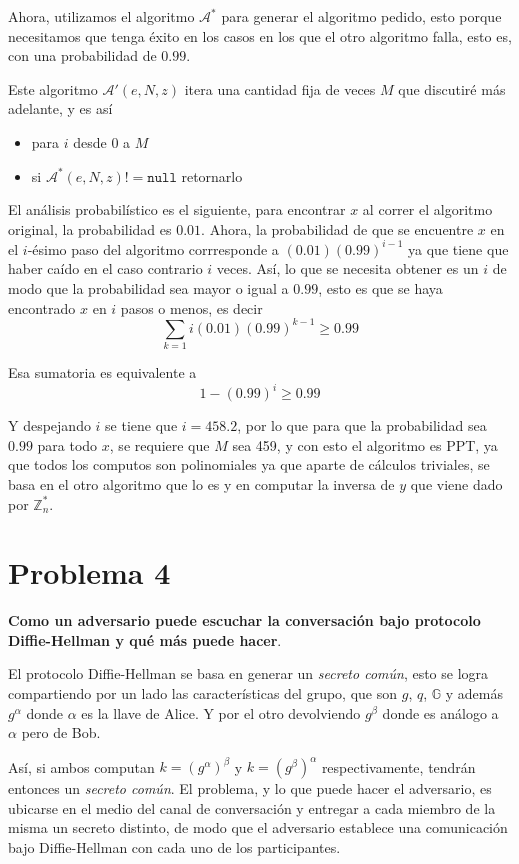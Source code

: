 \documentclass[twoside]{tareas}
\begin{document}
Ahora, utilizamos el algoritmo $\mathcal{A}^*$ para generar el algoritmo pedido, esto porque necesitamos que tenga éxito en los casos en los que el otro algoritmo falla, esto es, con una probabilidad de $0.99$.

Este algoritmo $\mathcal{A}'(e, N, z)$ itera una cantidad fija de veces $M$ que discutiré más adelante, y es así

\begin{itemize}
    \item para $i$ desde 0 a $M$
    \item si $\mathcal{A}^*(e, N, z) != \texttt{null}$ retornarlo
\end{itemize}

El análisis probabilístico es el siguiente, para encontrar $x$ al correr el algoritmo original, la probabilidad es $0.01$. Ahora, la probabilidad de que se encuentre $x$ en el $i$-ésimo paso del algoritmo corrresponde a $(0.01)(0.99)^{i-1}$ ya que tiene que haber caído en el caso contrario $i$ veces. Así, lo que se necesita obtener es un $i$ de modo que la probabilidad sea mayor o igual a $0.99$, esto es que se haya encontrado $x$ en $i$ pasos o menos, es decir
$$\sum_{k=1}{i}(0.01)(0.99)^{k-1} \geq 0.99$$

Esa sumatoria es equivalente a
$$1-(0.99)^i \geq 0.99$$

Y despejando $i$ se tiene que $i=458.2$, por lo que para que la probabilidad sea $0.99$ para todo $x$, se requiere que $M$ sea 459, y con esto el algoritmo es PPT, ya que todos los computos son polinomiales ya que aparte de cálculos triviales, se basa en el otro algoritmo que lo es y en computar la inversa de $y$ que viene dado por $\mathbb{Z}_n^*$.


\section*{Problema 4}

\textbf{Como un adversario puede escuchar la conversación bajo protocolo Diffie-Hellman y qué más puede hacer}.

El protocolo Diffie-Hellman se basa en generar un \textit{secreto común}, esto se logra compartiendo por un lado las características del grupo, que son $g$, $q$, $\mathbb{G}$ y además $g^\alpha$ donde $\alpha$ es la llave de Alice. Y por el otro devolviendo $g^\beta$ donde es análogo a $\alpha$ pero de Bob.

Así, si ambos computan $k = (g^\alpha)^\beta$ y $k = (g^\beta)^\alpha$ respectivamente, tendrán entonces un \textit{secreto común}. El problema, y lo que puede hacer el adversario, es ubicarse en el medio del canal de conversación y entregar a cada miembro de la misma un secreto distinto, de modo que el adversario establece una comunicación bajo Diffie-Hellman con cada uno de los participantes.
\end{document}
